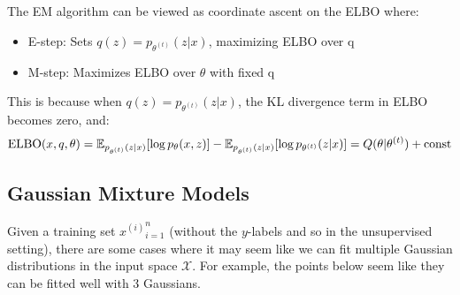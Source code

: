   \begin{corollary}
    The EM algorithm can be viewed as coordinate ascent on the ELBO where:
    \begin{itemize}
      \item E-step: Sets $q(z) = p_{\theta^{(t)}}(z|x)$, maximizing ELBO over q
      \item M-step: Maximizes ELBO over $\theta$ with fixed q
    \end{itemize}
    This is because when $q(z) = p_{\theta^{(t)}}(z|x)$, the KL divergence term in ELBO becomes zero, and:
    \begin{equation}
      \elbo(x, q, \theta) = \mathbb{E}_{p_{\theta^{(t)}}(z|x)}[\log p_\theta(x,z)] - \mathbb{E}_{p_{\theta^{(t)}}(z|x)}[\log p_{\theta^{(t)}}(z|x)] = Q(\theta|\theta^{(t)}) + \text{const}
    \end{equation}
  \end{corollary}

\subsection{Gaussian Mixture Models}

  Given a training set ${x^{(i)}}_{i=1}^n$ (without the $y$-labels and so in the unsupervised setting), there are some cases where it may seem like we can fit multiple Gaussian distributions in the input space $\mathcal{X}$. For example, the points below seem like they can be fitted well with 3 Gaussians.

